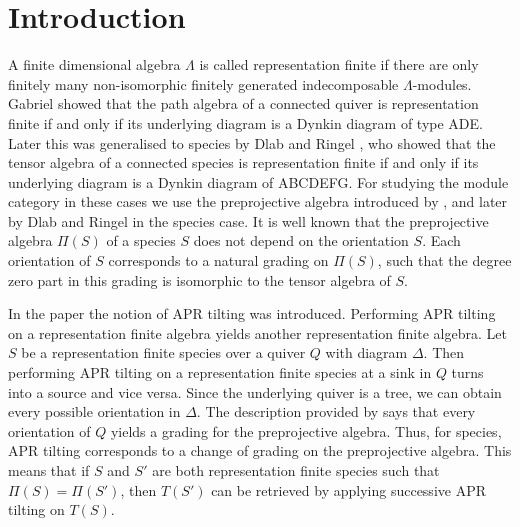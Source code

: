 \documentclass[a4paper, reqno]{amsart}
\theoremstyle{definition}
\begin{document}
\fi

\section{Introduction}
A finite dimensional algebra $\Lambda$ is called representation finite if there are only finitely many non-isomorphic finitely generated indecomposable $\Lambda$-modules. Gabriel \cite{gabriel1973indecomposable} showed that the path algebra of a connected quiver is representation finite if and only if its underlying diagram is a Dynkin diagram of type ADE. Later this was generalised to species by Dlab and Ringel \cite{dlab1975algebras}, who showed that the tensor algebra of a connected species is representation finite if and only if its underlying diagram is a Dynkin diagram of ABCDEFG. For studying the module category in these cases we use the preprojective algebra introduced by \cite{Gelfand1979ModelAA}, and later by Dlab and Ringel \cite{Dlab_1980} in the species case. It is well known that the preprojective algebra $\Pi(S)$ of a species $S$ does not depend on the orientation $S$. Each orientation of $S$ corresponds to a natural grading on $\Pi(S)$, such that the degree zero part in this grading is isomorphic to the tensor algebra of $S$.

In the paper \cite{APR1979} the notion of APR tilting was introduced. Performing APR tilting on a representation finite algebra yields another representation finite algebra. Let $S$ be a representation finite species over a quiver $Q$ with diagram $\Delta$. Then performing APR tilting on a representation finite species at a sink in $Q$ turns into a source and vice versa. Since the underlying quiver is a tree, we can obtain every possible orientation in $\Delta$. The description provided by \cite{Dlab_1980} says that every orientation of $Q$ yields a grading for the preprojective algebra. Thus, for species, APR tilting corresponds to a change of grading on the preprojective algebra. This means that if $S$ and $S'$ are both representation finite species such that $\Pi(S) = \Pi(S')$, then $T(S')$ can be retrieved by applying successive APR tilting on $T(S)$.
\end{document}
